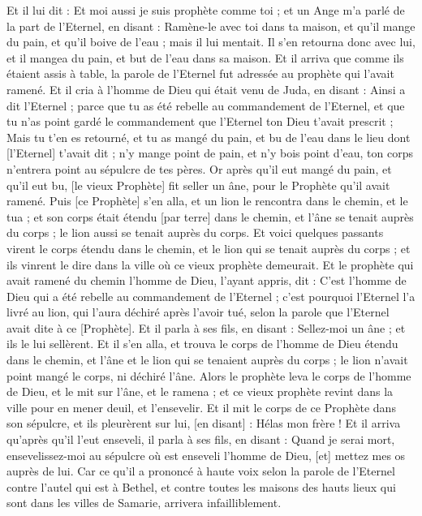 \begin{multicols}{2}
Et il lui dit : Et moi aussi je suis prophète comme toi ; et un Ange m'a parlé de la part de l'Eternel, en disant : Ramène-le avec toi dans ta maison, et qu'il mange du pain, et qu'il boive de l'eau ; mais il lui mentait.
Il s'en retourna donc avec lui, et il mangea du pain, et but de l'eau dans sa maison.
Et il arriva que comme ils étaient assis à table, la parole de l'Eternel fut adressée au prophète qui l'avait ramené.
Et il cria à l'homme de Dieu qui était venu de Juda, en disant : Ainsi a dit l'Eternel ; parce que tu as été rebelle au commandement de l'Eternel, et que tu n'as point gardé le commandement que l'Eternel ton Dieu t'avait prescrit ;
Mais tu t'en es retourné, et tu as mangé du pain, et bu de l'eau dans le lieu dont [l'Eternel] t'avait dit ; n'y mange point de pain, et n'y bois point d'eau, ton corps n'entrera point au sépulcre de tes pères.
Or après qu'il eut mangé du pain, et qu'il eut bu, [le vieux Prophète] fit seller un âne, pour le Prophète qu'il avait ramené.
Puis [ce Prophète] s'en alla, et un lion le rencontra dans le chemin, et le tua ; et son corps était étendu [par terre] dans le chemin, et l'âne se tenait auprès du corps ; le lion aussi se tenait auprès du corps.
Et voici quelques passants virent le corps étendu dans le chemin, et le lion qui se tenait auprès du corps ; et ils vinrent le dire dans la ville où ce vieux prophète demeurait.
Et le prophète qui avait ramené du chemin l'homme de Dieu, l'ayant appris, dit : C'est l'homme de Dieu qui a été rebelle au commandement de l'Eternel ; c'est pourquoi l'Eternel l'a livré au lion, qui l'aura déchiré après l'avoir tué, selon la parole que l'Eternel avait dite à ce [Prophète].
Et il parla à ses fils, en disant : Sellez-moi un âne ; et ils le lui sellèrent.
Et il s'en alla, et trouva le corps de l'homme de Dieu étendu dans le chemin, et l'âne et le lion qui se tenaient auprès du corps ; le lion n'avait point mangé le corps, ni déchiré l'âne.
Alors le prophète leva le corps de l'homme de Dieu, et le mit sur l'âne, et le ramena ; et ce vieux prophète revint dans la ville pour en mener deuil, et l'ensevelir.
Et il mit le corps de ce Prophète dans son sépulcre, et ils pleurèrent sur lui, [en disant] : Hélas mon frère !
Et il arriva qu'après qu'il l'eut enseveli, il parla à ses fils, en disant : Quand je serai mort, ensevelissez-moi au sépulcre où est enseveli l'homme de Dieu, [et] mettez mes os auprès de lui.
Car ce qu'il a prononcé à haute voix selon la parole de l'Eternel contre l'autel qui est à Bethel, et contre toutes les maisons des hauts lieux qui sont dans les villes de Samarie, arrivera infailliblement.

\end{multicols}
